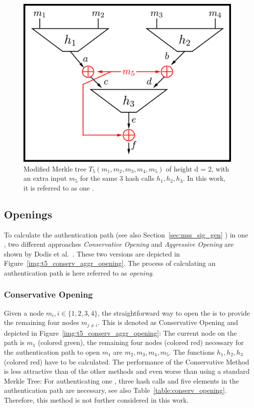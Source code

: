 \begin{figure}
\centering
\includegraphics[]{images/Methods/abcd_paperT5_block_depiction.png}
\caption{Modified Merkle tree $T_5(m_1, m_2, m_3, m_4, m_5)$ of height d = 2,   with an extra input $m_5$ for the same 3 hash calls $h_1, h_2, h_3$. In this work, it is referred to as one \tfblock.~\cite{T5_paper}}
\label{img:t5_paper_block_depiction}
\end{figure}

\subsection{\texorpdfstring{\tf}{T5} Openings}
To calculate the authentication path (see also Section~\ref{sec:mss_sig_gen} ) in one \tfblock, two different approaches \textit{Conservative Opening} and \textit{Aggressive Opening} are shown by Dodis et al.~\cite{T5_paper}. These two versions are depicted in Figure~\ref{img:t5_conserv_aggr_opening}.
The process of calculating an authentication path is here referred to as \textit{opening}. 

\subsubsection{Conservative Opening}
\label{sec:conserv_opening}
Given a node $m_i, i \in \{1,2,3,4\}$, the straightforward way to open the \tfblock is to provide the remaining four nodes $m_{j \neq i}$. This is denoted as Conservative Opening and depicted in Figure~\ref{img:t5_conserv_aggr_opening}: The current node on the path is $m_1$ (colored green), the remaining four nodes (colored red) necessary for the authentication path to open $m_1$ are $m_2, m_3, m_4, m_5$. The functions $h_1, h_2, h_3$ (colored red) have to be calculated. The performance of the Conservative Method is less attractive than of the other methods and even worse than using a standard Merkle Tree: For authenticating one \tfblock, three hash calls and five elements in the authentication path are necessary, see also Table~\ref{table:conserv_opening}. Therefore, this method is not further considered in this work. %


